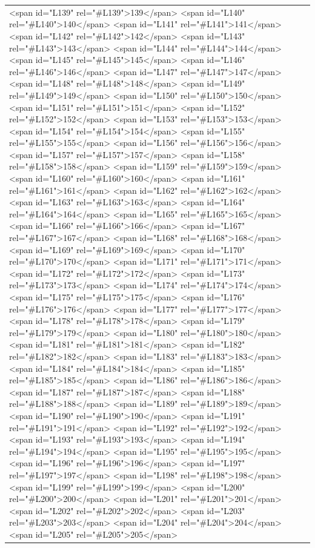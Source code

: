 \documentclass[a4paper,11pt,french]{article}
\begin{document}
\begin{tabular}{|m{8cm}|m{8cm}|}
<span id="L139" rel="#L139">139</span>
<span id="L140" rel="#L140">140</span>
<span id="L141" rel="#L141">141</span>
<span id="L142" rel="#L142">142</span>
<span id="L143" rel="#L143">143</span>
<span id="L144" rel="#L144">144</span>
<span id="L145" rel="#L145">145</span>
<span id="L146" rel="#L146">146</span>
<span id="L147" rel="#L147">147</span>
<span id="L148" rel="#L148">148</span>
<span id="L149" rel="#L149">149</span>
<span id="L150" rel="#L150">150</span>
<span id="L151" rel="#L151">151</span>
<span id="L152" rel="#L152">152</span>
<span id="L153" rel="#L153">153</span>
<span id="L154" rel="#L154">154</span>
<span id="L155" rel="#L155">155</span>
<span id="L156" rel="#L156">156</span>
<span id="L157" rel="#L157">157</span>
<span id="L158" rel="#L158">158</span>
<span id="L159" rel="#L159">159</span>
<span id="L160" rel="#L160">160</span>
<span id="L161" rel="#L161">161</span>
<span id="L162" rel="#L162">162</span>
<span id="L163" rel="#L163">163</span>
<span id="L164" rel="#L164">164</span>
<span id="L165" rel="#L165">165</span>
<span id="L166" rel="#L166">166</span>
<span id="L167" rel="#L167">167</span>
<span id="L168" rel="#L168">168</span>
<span id="L169" rel="#L169">169</span>
<span id="L170" rel="#L170">170</span>
<span id="L171" rel="#L171">171</span>
<span id="L172" rel="#L172">172</span>
<span id="L173" rel="#L173">173</span>
<span id="L174" rel="#L174">174</span>
<span id="L175" rel="#L175">175</span>
<span id="L176" rel="#L176">176</span>
<span id="L177" rel="#L177">177</span>
<span id="L178" rel="#L178">178</span>
<span id="L179" rel="#L179">179</span>
<span id="L180" rel="#L180">180</span>
<span id="L181" rel="#L181">181</span>
<span id="L182" rel="#L182">182</span>
<span id="L183" rel="#L183">183</span>
<span id="L184" rel="#L184">184</span>
<span id="L185" rel="#L185">185</span>
<span id="L186" rel="#L186">186</span>
<span id="L187" rel="#L187">187</span>
<span id="L188" rel="#L188">188</span>
<span id="L189" rel="#L189">189</span>
<span id="L190" rel="#L190">190</span>
<span id="L191" rel="#L191">191</span>
<span id="L192" rel="#L192">192</span>
<span id="L193" rel="#L193">193</span>
<span id="L194" rel="#L194">194</span>
<span id="L195" rel="#L195">195</span>
<span id="L196" rel="#L196">196</span>
<span id="L197" rel="#L197">197</span>
<span id="L198" rel="#L198">198</span>
<span id="L199" rel="#L199">199</span>
<span id="L200" rel="#L200">200</span>
<span id="L201" rel="#L201">201</span>
<span id="L202" rel="#L202">202</span>
<span id="L203" rel="#L203">203</span>
<span id="L204" rel="#L204">204</span>
<span id="L205" rel="#L205">205</span>

\end{tabular}
\end{document}

